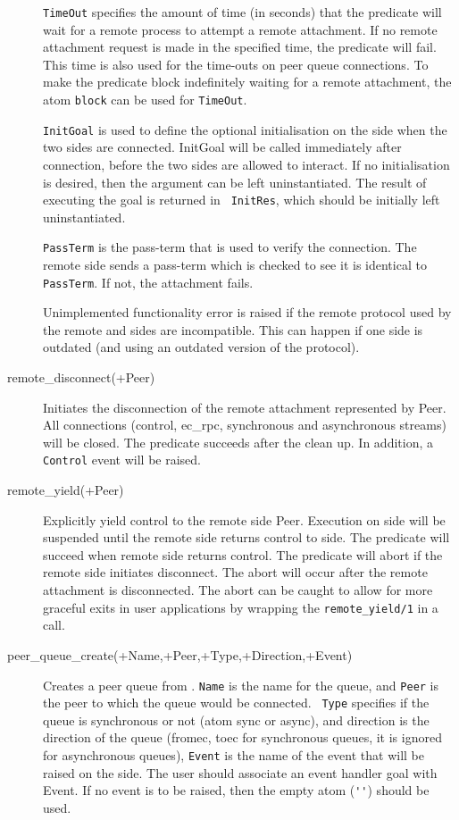 \begin{description}
{\tt TimeOut} specifies the amount of time (in seconds) that the predicate
will wait for a remote process to attempt a remote attachment. If no remote
attachment request is made in the specified time, the predicate will
fail. This time is also used for the time-outs on peer queue connections.
To make the predicate block indefinitely waiting for a remote
attachment, the atom {\tt block} can be used for {\tt TimeOut}. 

{\tt InitGoal} is used to define the optional initialisation on the
{\eclipse} side when the two sides are connected. InitGoal will be called
immediately after connection, before the two sides are allowed to
interact. If no initialisation is desired, then the argument can be left
uninstantiated. The result of executing the goal is returned in {\tt
InitRes}, which should be initially left uninstantiated.

{\tt PassTerm} is the pass-term that is used  to verify the
connection. The remote side sends a pass-term which is checked to see it is
identical to {\tt PassTerm}. If not, the attachment fails.

Unimplemented functionality error is raised if the remote protocol used by
the remote and {\eclipse} sides are incompatible. This can happen if
one side is outdated (and using an outdated version of the protocol). 

\item[\index{remote_disconnect/1}remote_disconnect(+Peer)]
Initiates the disconnection of the remote attachment represented by
Peer. All connections (control, ec_rpc, synchronous and asynchronous
streams) will be closed. The predicate succeeds after the clean up. In
addition, a {\tt Control} event will be raised. 

\item[\index{remote_yield/1}remote_yield(+Peer)]
Explicitly yield control to the remote side Peer. Execution on
{\eclipse} side will be suspended until the remote side returns control to
{\eclipse} side. The predicate will succeed when remote side returns
control. The predicate will abort if the remote side initiates
disconnect. The abort will occur after the remote attachment is disconnected.
The abort can be caught to allow for more graceful exits in user
applications by wrapping the {\tt remote_yield/1} in a  call.

\item[\index{peer_queue_create/5}peer_queue_create(+Name,+Peer,+Type,+Direction,+Event)]
Creates a peer queue from {\eclipse}. {\tt Name} is the name for the queue,
and {\tt Peer} is the peer to which the queue would be connected. {\tt
Type} specifies if the queue is synchronous or not (atom sync or async),
and direction is the direction of the queue (fromec, toec for synchronous
queues, it is ignored for asynchronous queues), {\tt Event} is the name of
the event that will be raised on the {\eclipse} side. The user should
associate an event handler goal with Event. If no event is to be raised,
then the empty atom (\verb+''+) should be used.


\end{description}
